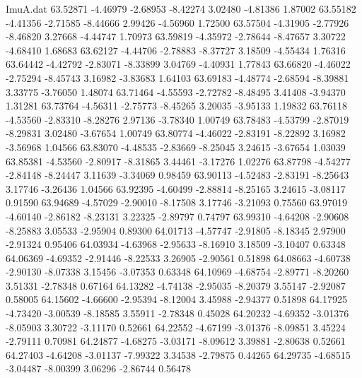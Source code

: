 \begin{filecontents}{ImuA.dat}
  63.52871   -4.46979   -2.68953   -8.42274    3.02480   -4.81386    1.87002
  63.55182   -4.41356   -2.71585   -8.44666    2.99426   -4.56960    1.72500
  63.57504   -4.31905   -2.77926   -8.46820    3.27668   -4.44747    1.70973
  63.59819   -4.35972   -2.78644   -8.47657    3.30722   -4.68410    1.68683
  63.62127   -4.44706   -2.78883   -8.37727    3.18509   -4.55434    1.76316
  63.64442   -4.42792   -2.83071   -8.33899    3.04769   -4.40931    1.77843
  63.66820   -4.46022   -2.75294   -8.45743    3.16982   -3.83683    1.64103
  63.69183   -4.48774   -2.68594   -8.39881    3.33775   -3.76050    1.48074
  63.71464   -4.55593   -2.72782   -8.48495    3.41408   -3.94370    1.31281
  63.73764   -4.56311   -2.75773   -8.45265    3.20035   -3.95133    1.19832
  63.76118   -4.53560   -2.83310   -8.28276    2.97136   -3.78340    1.00749
  63.78483   -4.53799   -2.87019   -8.29831    3.02480   -3.67654    1.00749
  63.80774   -4.46022   -2.83191   -8.22892    3.16982   -3.56968    1.04566
  63.83070   -4.48535   -2.83669   -8.25045    3.24615   -3.67654    1.03039
  63.85381   -4.53560   -2.80917   -8.31865    3.44461   -3.17276    1.02276
  63.87798   -4.54277   -2.84148   -8.24447    3.11639   -3.34069    0.98459
  63.90113   -4.52483   -2.83191   -8.25643    3.17746   -3.26436    1.04566
  63.92395   -4.60499   -2.88814   -8.25165    3.24615   -3.08117    0.91590
  63.94689   -4.57029   -2.90010   -8.17508    3.17746   -3.21093    0.75560
  63.97019   -4.60140   -2.86182   -8.23131    3.22325   -2.89797    0.74797
  63.99310   -4.64208   -2.90608   -8.25883    3.05533   -2.95904    0.89300
  64.01713   -4.57747   -2.91805   -8.18345    2.97900   -2.91324    0.95406
  64.03934   -4.63968   -2.95633   -8.16910    3.18509   -3.10407    0.63348
  64.06369   -4.69352   -2.91446   -8.22533    3.26905   -2.90561    0.51898
  64.08663   -4.60738   -2.90130   -8.07338    3.15456   -3.07353    0.63348
  64.10969   -4.68754   -2.89771   -8.20260    3.51331   -2.78348    0.67164
  64.13282   -4.74138   -2.95035   -8.20379    3.55147   -2.92087    0.58005
  64.15602   -4.66600   -2.95394   -8.12004    3.45988   -2.94377    0.51898
  64.17925   -4.73420   -3.00539   -8.18585    3.55911   -2.78348    0.45028
  64.20232   -4.69352   -3.01376   -8.05903    3.30722   -3.11170    0.52661
  64.22552   -4.67199   -3.01376   -8.09851    3.45224   -2.79111    0.70981
  64.24877   -4.68275   -3.03171   -8.09612    3.39881   -2.80638    0.52661
  64.27403   -4.64208   -3.01137   -7.99322    3.34538   -2.79875    0.44265
  64.29735   -4.68515   -3.04487   -8.00399    3.06296   -2.86744    0.56478

\end{filecontents}
